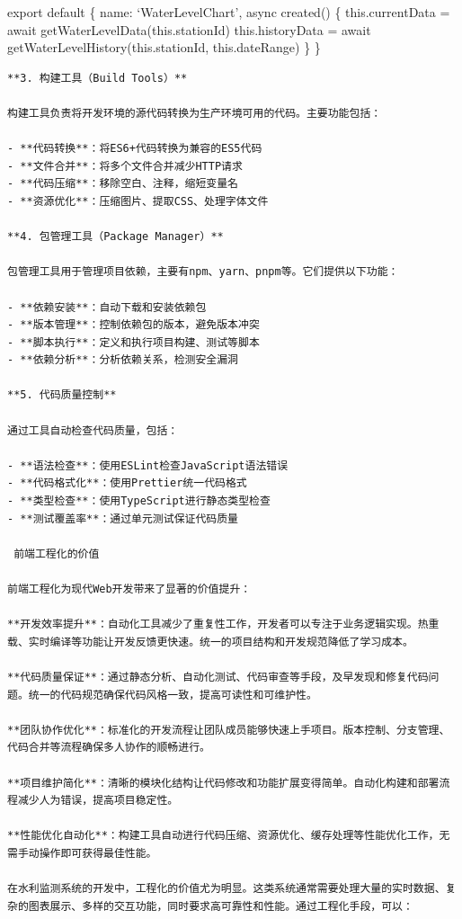 {{export default \{ name: `WaterLevelChart', async created() \{ this.currentData = await getWaterLevelData(this.stationId) this.historyData = await getWaterLevelHistory(this.stationId, this.dateRange) \} \}

\begin{lstlisting}
**3. 构建工具（Build Tools）**

构建工具负责将开发环境的源代码转换为生产环境可用的代码。主要功能包括：

- **代码转换**：将ES6+代码转换为兼容的ES5代码
- **文件合并**：将多个文件合并减少HTTP请求
- **代码压缩**：移除空白、注释，缩短变量名
- **资源优化**：压缩图片、提取CSS、处理字体文件

**4. 包管理工具（Package Manager）**

包管理工具用于管理项目依赖，主要有npm、yarn、pnpm等。它们提供以下功能：

- **依赖安装**：自动下载和安装依赖包
- **版本管理**：控制依赖包的版本，避免版本冲突
- **脚本执行**：定义和执行项目构建、测试等脚本
- **依赖分析**：分析依赖关系，检测安全漏洞

**5. 代码质量控制**

通过工具自动检查代码质量，包括：

- **语法检查**：使用ESLint检查JavaScript语法错误
- **代码格式化**：使用Prettier统一代码格式
- **类型检查**：使用TypeScript进行静态类型检查
- **测试覆盖率**：通过单元测试保证代码质量

 前端工程化的价值

前端工程化为现代Web开发带来了显著的价值提升：

**开发效率提升**：自动化工具减少了重复性工作，开发者可以专注于业务逻辑实现。热重载、实时编译等功能让开发反馈更快速。统一的项目结构和开发规范降低了学习成本。

**代码质量保证**：通过静态分析、自动化测试、代码审查等手段，及早发现和修复代码问题。统一的代码规范确保代码风格一致，提高可读性和可维护性。

**团队协作优化**：标准化的开发流程让团队成员能够快速上手项目。版本控制、分支管理、代码合并等流程确保多人协作的顺畅进行。

**项目维护简化**：清晰的模块化结构让代码修改和功能扩展变得简单。自动化构建和部署流程减少人为错误，提高项目稳定性。

**性能优化自动化**：构建工具自动进行代码压缩、资源优化、缓存处理等性能优化工作，无需手动操作即可获得最佳性能。

在水利监测系统的开发中，工程化的价值尤为明显。这类系统通常需要处理大量的实时数据、复杂的图表展示、多样的交互功能，同时要求高可靠性和性能。通过工程化手段，可以：


\end{lstlisting}}}
